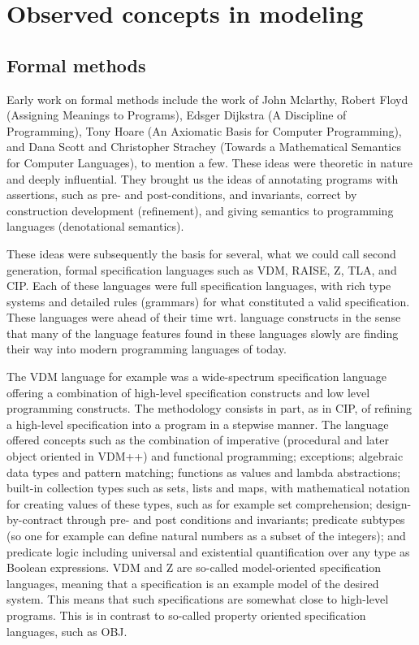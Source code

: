 
\section{Observed concepts in modeling}

\subsection{Formal methods}

Early work on formal methods include the work of John Mclarthy, 
Robert Floyd (Assigning Meanings to Programs), Edsger Dijkstra (A 
Discipline of Programming), Tony Hoare (An Axiomatic Basis for 
Computer Programming), and Dana Scott and Christopher Strachey 
(Towards a Mathematical Semantics for Computer Languages), to 
mention a few. These ideas were theoretic in nature and deeply 
influential. They brought us the ideas of  annotating programs with 
assertions, such as pre- and post-conditions, and invariants, 
correct by construction development (refinement), and giving 
semantics to programming languages (denotational semantics). 

These ideas were subsequently the basis for several, what we could 
call second generation, formal specification languages such as VDM, 
RAISE, Z, TLA, and CIP. Each of these languages were full 
specification languages, with rich type systems and detailed rules 
(grammars) for what constituted a valid specification. These 
languages were ahead of their time wrt. language constructs in the 
sense that many of the language features found in these languages 
slowly are finding their way into modern programming languages of 
today. 

The VDM language for example was a wide-spectrum specification 
language offering a combination of high-level specification 
constructs and low level programming constructs. The methodology 
consists in part, as in CIP, of refining a high-level specification 
into a program in a stepwise manner. The language offered concepts 
such as the combination of imperative (procedural and later object 
oriented in VDM++) and functional programming; exceptions; 
algebraic data types and pattern matching; functions as values and 
lambda abstractions; built-in collection types such as sets, lists 
and maps, with mathematical notation for creating values of these 
types, such as for example set comprehension; design-by-contract 
through pre- and post conditions and invariants; predicate subtypes 
(so one for example can define natural numbers as a subset of the 
integers);  and predicate logic including universal and existential 
quantification over any type as Boolean expressions.  VDM and Z are 
so-called model-oriented specification languages, meaning that a 
specification is an example model of the desired system. This means 
that such specifications are somewhat close to high-level programs. 
This is in contrast to so-called property oriented specification 
languages, such as OBJ.  


